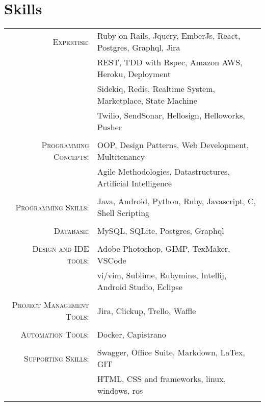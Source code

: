 \documentclass[a4paper,10pt]{article}
\begin{document}
\section{Skills}
\begin{tabular}{rl}	
\textsc{Expertise:} &Ruby on Rails, Jquery, EmberJs, React, Postgres, Graphql, Jira\\
								& REST, TDD with Rspec, Amazon AWS, Heroku, Deployment \\
								& Sidekiq, Redis, Realtime System, Marketplace, State Machine\\
								& Twilio, SendSonar, Hellosign, Helloworks,  Pusher  
								\\
								\\
\textsc{Programming Concepts:} &OOP, Design Patterns, Web Development, Multitenancy \\
								&  Agile Methodologies, Datastructures, Artificial Intelligence\\\\
\textsc{Programming Skills:}  & Java, Android, Python, Ruby, Javascript, C, Shell Scripting\\\\
\textsc{Database:} & MySQL, SQLite, Postgres, Graphql\\\\

\textsc{Design and IDE tools:} & Adobe Photoshop, GIMP, TexMaker, VSCode\\
							   & vi/vim, Sublime, Rubymine, Intellij, Android Studio, Eclipse\\\\
\textsc{Project Management Tools:} & Jira, Clickup, Trello, Waffle\\\\	
\textsc{Automation Tools:} &Docker, Capistrano\\\\
\textsc{Supporting Skills:} & Swagger, Office Suite, Markdown, LaTex, GIT\\
		& HTML, CSS and frameworks, linux, windows, ros \\\\						   
		 
\end{tabular}
\end{document}
